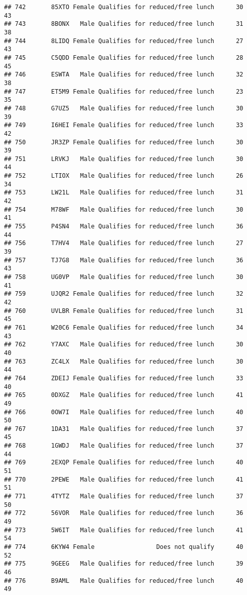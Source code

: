\documentclass[
]{article}
\begin{document}
\begin{verbatim}
## 742       85XTO Female Qualifies for reduced/free lunch      30       43
## 743       8BONX   Male Qualifies for reduced/free lunch      31       38
## 744       8LIDQ Female Qualifies for reduced/free lunch      27       43
## 745       C5QDD Female Qualifies for reduced/free lunch      28       45
## 746       ESWTA   Male Qualifies for reduced/free lunch      32       38
## 747       ET5M9 Female Qualifies for reduced/free lunch      23       35
## 748       G7UZ5   Male Qualifies for reduced/free lunch      30       39
## 749       I6HEI Female Qualifies for reduced/free lunch      33       42
## 750       JR3ZP Female Qualifies for reduced/free lunch      30       39
## 751       LRVKJ   Male Qualifies for reduced/free lunch      30       44
## 752       LTIOX   Male Qualifies for reduced/free lunch      26       34
## 753       LW21L   Male Qualifies for reduced/free lunch      31       42
## 754       M78WF   Male Qualifies for reduced/free lunch      30       41
## 755       P4SN4   Male Qualifies for reduced/free lunch      36       44
## 756       T7HV4   Male Qualifies for reduced/free lunch      27       39
## 757       TJ7G8   Male Qualifies for reduced/free lunch      36       43
## 758       UG0VP   Male Qualifies for reduced/free lunch      30       41
## 759       UJQR2 Female Qualifies for reduced/free lunch      32       42
## 760       UVLBR Female Qualifies for reduced/free lunch      31       45
## 761       W20C6 Female Qualifies for reduced/free lunch      34       43
## 762       Y7AXC   Male Qualifies for reduced/free lunch      30       40
## 763       ZC4LX   Male Qualifies for reduced/free lunch      30       44
## 764       ZDEIJ Female Qualifies for reduced/free lunch      33       40
## 765       0DXGZ   Male Qualifies for reduced/free lunch      41       49
## 766       0OW7I   Male Qualifies for reduced/free lunch      40       50
## 767       1DA31   Male Qualifies for reduced/free lunch      37       45
## 768       1GWDJ   Male Qualifies for reduced/free lunch      37       44
## 769       2EXQP Female Qualifies for reduced/free lunch      40       51
## 770       2PEWE   Male Qualifies for reduced/free lunch      41       51
## 771       4TYTZ   Male Qualifies for reduced/free lunch      37       50
## 772       56VOR   Male Qualifies for reduced/free lunch      36       49
## 773       5W6IT   Male Qualifies for reduced/free lunch      41       54
## 774       6KYW4 Female                 Does not qualify      40       52
## 775       9GEEG   Male Qualifies for reduced/free lunch      39       46
## 776       B9AML   Male Qualifies for reduced/free lunch      40       49

\end{verbatim}
\end{document}
